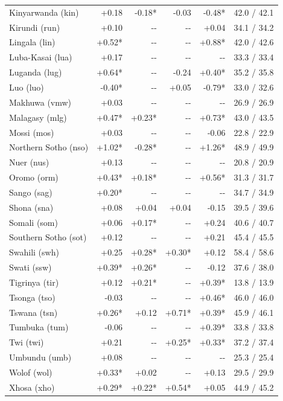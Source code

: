 {\begin{longtable}[]{@{}lrrrrr@{}}
Kinyarwanda (kin) & +0.18 & -0.18* & -0.03 & -0.48* & 42.0 / 42.1 \\
Kirundi (run) & +0.10 & -\/- & -\/- & +0.04 & 34.1 / 34.2 \\
Lingala (lin) & +0.52* & -\/- & -\/- & +0.88* & 42.0 / 42.6 \\
Luba-Kasai (lua) & +0.17 & -\/- & -\/- & -\/- & 33.3 / 33.4 \\
Luganda (lug) & +0.64* & -\/- & -0.24 & +0.40* & 35.2 / 35.8 \\
Luo (luo) & -0.40* & -\/- & +0.05 & -0.79* & 33.0 / 32.6 \\
Makhuwa (vmw) & +0.03 & -\/- & -\/- & -\/- & 26.9 / 26.9 \\
Malagasy (mlg) & +0.47* & +0.23* & -\/- & +0.73* & 43.0 / 43.5 \\
Mossi (mos) & +0.03 & -\/- & -\/- & -0.06 & 22.8 / 22.9 \\
Northern Sotho (nso) & +1.02* & -0.28* & -\/- & +1.26* & 48.9 / 49.9 \\
Nuer (nus) & +0.13 & -\/- & -\/- & -\/- & 20.8 / 20.9 \\
Oromo (orm) & +0.43* & +0.18* & -\/- & +0.56* & 31.3 / 31.7 \\
Sango (sag) & +0.20* & -\/- & -\/- & -\/- & 34.7 / 34.9 \\
Shona (sna) & +0.08 & +0.04 & +0.04 & -0.15 & 39.5 / 39.6 \\
Somali (som) & +0.06 & +0.17* & -\/- & +0.24 & 40.6 / 40.7 \\
Southern Sotho (sot) & +0.12 & -\/- & -\/- & +0.21 & 45.4 / 45.5 \\
Swahili (swh) & +0.25 & +0.28* & +0.30* & +0.12 & 58.4 / 58.6 \\
Swati (ssw) & +0.39* & +0.26* & -\/- & -0.12 & 37.6 / 38.0 \\
Tigrinya (tir) & +0.12 & +0.21* & -\/- & +0.39* & 13.8 / 13.9 \\
Tsonga (tso) & -0.03 & -\/- & -\/- & +0.46* & 46.0 / 46.0 \\
Tswana (tsn) & +0.26* & +0.12 & +0.71* & +0.39* & 45.9 / 46.1 \\
Tumbuka (tum) & -0.06 & -\/- & -\/- & +0.39* & 33.8 / 33.8 \\
Twi (twi) & +0.21 & -\/- & +0.25* & +0.33* & 37.2 / 37.4 \\
Umbundu (umb) & +0.08 & -\/- & -\/- & -\/- & 25.3 / 25.4 \\
Wolof (wol) & +0.33* & +0.02 & -\/- & +0.13 & 29.5 / 29.9 \\
Xhosa (xho) & +0.29* & +0.22* & +0.54* & +0.05 & 44.9 / 45.2 \\

\end{longtable}}

